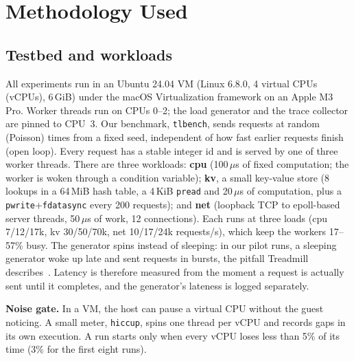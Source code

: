 \section{Methodology Used}
\label{sec:method}

\subsection{Testbed and workloads}
All experiments run in an Ubuntu 24.04 VM (Linux 6.8.0, 4 virtual CPUs (vCPUs), 6\,GiB)
under the macOS Virtualization framework on an Apple M3 Pro. Worker threads
run on CPUs 0--2; the load generator and the trace collector are pinned to
CPU~3. Our benchmark, \texttt{tlbench}, sends requests at random (Poisson)
times from a fixed seed, independent of how fast earlier requests finish
(open loop). Every request has a stable integer id and is served by one of
three worker threads. There are three workloads: \textbf{cpu} (100\,$\mu$s
of fixed computation; the worker is woken through a condition variable);
\textbf{kv}, a small key-value store (8 lookups in a 64\,MiB hash table, a
4\,KiB \texttt{pread} and 20\,$\mu$s of computation, plus a
\texttt{pwrite}+\texttt{fdatasync} every 200 requests); and \textbf{net}
(loopback TCP to epoll-based server threads, 50\,$\mu$s of work, 12
connections). Each runs at three loads (cpu 7/12/17k, kv 30/50/70k, net
10/17/24k requests/s), which keep the workers 17--57\% busy. The generator
spins instead of sleeping: in our pilot runs, a sleeping generator woke up
late and sent requests in bursts, the pitfall Treadmill
describes~\cite{zhang2016treadmill}. Latency is therefore measured from the
moment a request is actually sent until it completes, and the generator's
lateness is logged separately.

\textbf{Noise gate.} In a VM, the host can pause a virtual CPU without the
guest noticing. A small meter, \texttt{hiccup}, spins one thread per vCPU
and records gaps in its own execution. A run starts only when every vCPU
loses less than 5\% of its time (3\% for the first eight runs).

